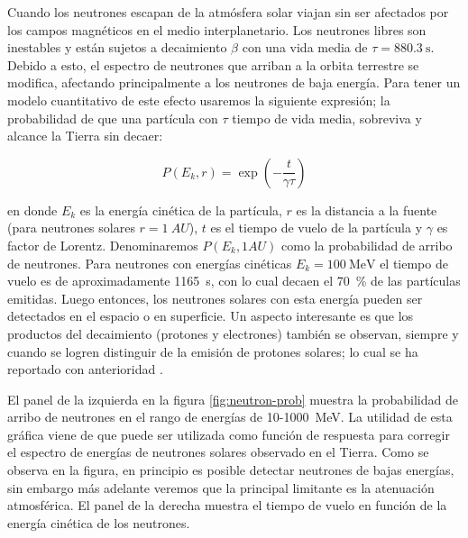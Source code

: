 Cuando los neutrones escapan de la atmósfera solar viajan sin ser afectados por los campos magnéticos en el medio interplanetario. Los neutrones libres son inestables y están sujetos a decaimiento $\beta$ con una vida media de $\tau=\SI{880.3}{\second}$. Debido a esto, el espectro de neutrones que arriban a la orbita terrestre se modifica, afectando principalmente a los neutrones de baja energía. Para tener un modelo cuantitativo de este efecto usaremos la siguiente expresión; la probabilidad de que una partícula con $\tau$ tiempo de vida media, sobreviva y alcance la Tierra sin decaer:

\begin{equation}
P\left(E_{k},r\right)=\exp\left(-\frac{t}{\gamma\tau}\right)
\end{equation}

en donde $E_{k}$ es la energía cinética de la partícula, $r$ es la distancia a la fuente (para neutrones solares $r=\SI{1}{AU}$), $t$ es el tiempo de vuelo de la partícula y $\gamma$ es factor de Lorentz. Denominaremos $P(E_{k},1AU)$ como la probabilidad de arribo de neutrones. Para neutrones con energías cinéticas $E_{k}=\SI{100}{\mega\electronvolt}$ el tiempo de vuelo es de aproximadamente \SI{1165}{\second}, con lo cual decaen el \SI{70}{\percent} de las partículas emitidas. Luego entonces, los neutrones solares con esta energía pueden ser detectados en el espacio o en superficie. Un aspecto interesante es que los productos del decaimiento (protones y electrones) también se observan, siempre y cuando se logren distinguir de la emisión de protones solares; lo cual se ha reportado con anterioridad \cite{evenson83,agueda11}.

El panel de la izquierda en la figura \ref{fig:neutron-prob} muestra la probabilidad de arribo de neutrones en el rango de energías de \num{10}-\SI{1000}{\mega\electronvolt}. La utilidad de esta gráfica viene de que puede ser utilizada como función de respuesta para corregir el espectro de energías de neutrones solares observado en el Tierra. Como se observa en la figura, en principio es posible detectar neutrones de bajas energías, sin embargo más adelante veremos que la principal limitante es la atenuación atmosférica. El panel de la derecha muestra el tiempo de vuelo en función de la energía cinética de los neutrones.

